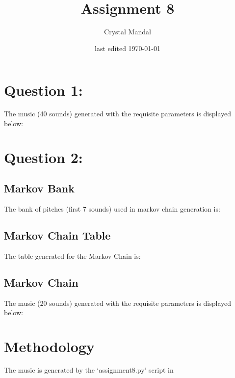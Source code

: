 \documentclass[12pt,letterpaper]{article}
\title{Assignment 8}
\author{Crystal Mandal}
\date{last edited \today}
\begin{document}
\maketitle

\section{Question 1:}
The music (40 sounds) generated with the requisite parameters is displayed below:

\begin{quote}
{%
\parindent 0pt
\noindent
\ifx\preLilyPondExample \undefined
\else
  \expandafter\preLilyPondExample
\fi
\def\lilypondbook{}%
%
\ifx\postLilyPondExample \undefined
\else
  \expandafter\postLilyPondExample
\fi
}
\end{quote}

\section{Question 2:}
\subsection{Markov Bank}
The bank of pitches (first 7 sounds) used in markov chain generation is:

\begin{quote}
{%
\parindent 0pt
\noindent
\ifx\preLilyPondExample \undefined
\else
  \expandafter\preLilyPondExample
\fi
\def\lilypondbook{}%
%
\ifx\postLilyPondExample \undefined
\else
  \expandafter\postLilyPondExample
\fi
}
\end{quote}

\subsection{Markov Chain Table}
The table generated for the Markov Chain is:


\subsection{Markov Chain}
The music (20 sounds) generated with the requisite parameters is displayed below:

\begin{quote}
{%
\parindent 0pt
\noindent
\ifx\preLilyPondExample \undefined
\else
  \expandafter\preLilyPondExample
\fi
\def\lilypondbook{}%
%
\ifx\postLilyPondExample \undefined
\else
  \expandafter\postLilyPondExample
\fi
}
\end{quote}

\section{Methodology}
The music is generated by the `assignment8.py' script in
\end{document}
